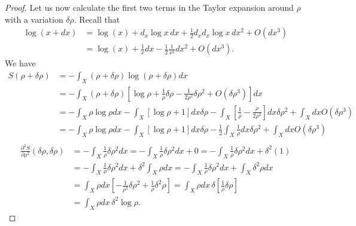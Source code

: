 \begin{mathSection}
\begin{proof}
	Let us now calculate the first two terms in the Taylor expansion around $\rho$ with a variation $\delta\rho$. Recall that
	\begin{equation}
		\begin{aligned}
			\log(x+dx) &= \log(x) + d_x \log x \, dx + \frac{1}{2} d_x d_x  \log x \, dx^2 + O(dx^3) \\
			&= \log(x) + \frac{1}{x} dx - \frac{1}{2} \frac{1}{x^2} dx^2 + O(dx^3).
		\end{aligned}
	\end{equation}
	We have
	\begin{equation}
		\begin{aligned}
			S(\rho + \delta \rho) &= -\int_X (\rho + \delta \rho) \log (\rho + \delta \rho) dx \\
			&=-\int_X (\rho + \delta \rho) \left[\log \rho + \frac{1}{\rho} \delta \rho - \frac{1}{2\rho^2} \delta \rho^2 + O(\delta \rho^3)\right] dx \\
			&= - \int_X \rho \log \rho dx - \int_X \left[\log \rho + 1 \right]dx \delta \rho -\int_X \left[\frac{1}{\rho} - \frac{\rho}{2\rho^2}\right] dx \delta \rho^2 + \int_X dx O(\delta\rho^3) \\
			&= - \int_X \rho \log \rho dx - \int_X \left[\log \rho + 1 \right]dx \delta \rho - 	
			\frac{1}{2}\int_X \frac{1}{\rho} dx \delta \rho^2 + \int_X dx O(\delta\rho^3) \\
		\end{aligned}
	\end{equation}
	\begin{equation}
		\begin{aligned}
			\frac{\partial^2 S}{\partial \rho^2}(\delta \rho, \delta \rho) &= -\int_X \frac{1}{\rho} \delta \rho^2 dx = -\int_X \frac{1}{\rho} \delta \rho^2 dx + 0 = -\int_X \frac{1}{\rho} \delta \rho^2 dx + \delta^2 (1) \\
			&= -\int_X \frac{1}{\rho} \delta \rho^2 dx + \delta^2 \int_X \rho dx = -\int_X \frac{1}{\rho} \delta \rho^2 dx + \int_X \delta^2 \rho dx \\
			&= \int_X \rho dx \left[-\frac{1}{\rho^2} \delta \rho^2 + \frac{1}{\rho} \delta^2 \rho \right]
			= \int_X \rho dx \, \delta \left[\frac{1}{\rho} \delta \rho \right] \\
			&= \int_X \rho dx \, \delta^2 \log \rho.
		\end{aligned}
	\end{equation}
	

\end{proof}
\end{mathSection}
